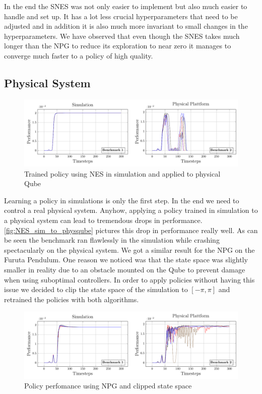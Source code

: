 In the end the SNES was not only easier to implement but also much easier to handle and set up. It has a lot less crucial hyperparameters that need to be adjusted and in addition it is also much more invariant to small changes in the hyperparameters. We have observed that even though the SNES takes much longer than the NPG to reduce its exploration to near zero it manages to converge much faster to a policy of high quality.

\subsection{Physical System}
\label{phys}
\vspace{-.8cm}
\begin{figure}[ht]
\centering
\includegraphics[scale=.5]{plots/nes_on_rr_master.pdf}
\caption{Trained policy using NES in simulation and applied to physical Qube}
\label{fig:NES_sim_to_physqube}
\end{figure}

Learning a policy in simulations is only the first step. In the end we need to control a real physical system. Anyhow, applying a policy trained in simulation to a physical system can lead to tremendous drops in performance. \autoref{fig:NES_sim_to_physqube} pictures this drop in performance really well. As can be seen the benchmark ran flawlessly in the simulation while crashing spectacularly on the physical system. We got a similar result for the NPG on the Furuta Pendulum. One reason we noticed was that the state space was slightly smaller in reality due to an obstacle mounted on the Qube to prevent damage when using suboptimal controllers. In order to apply policies without having this issue we decided to clip the state space of the simulation to $[-\pi, \pi]$ and retrained the policies with both algorithms.

\begin{figure}[ht]
\centering
\includegraphics[scale=.5]{plots/npg_on_rr_master.pdf}
\caption{Policy perfomance using NPG and clipped state space}
\label{fig:NPG_sim_to_physqube}
\end{figure}

